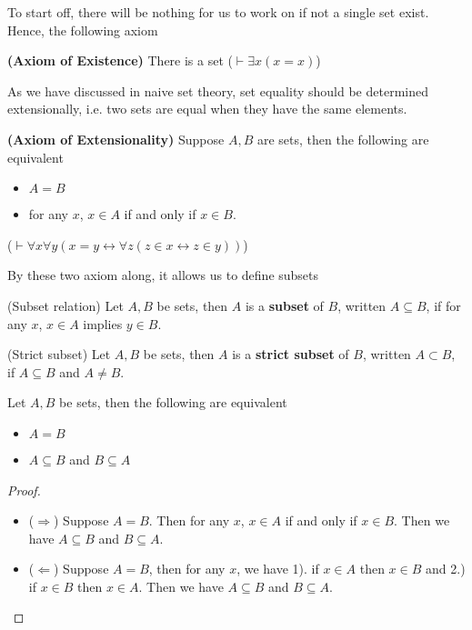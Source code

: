 To start off, there will be nothing for us to work on if not a single set exist. Hence, the following axiom
\begin{ax}
    \textbf{(Axiom of Existence)} There is a set ($\vdash \exists x(x=x)$)
\end{ax}
As we have discussed in naive set theory, set equality should be determined extensionally, i.e. two sets are equal when they have the same elements. 
\begin{ax}
    \textbf{(Axiom of Extensionality)} Suppose $A,B$ are sets, then the following are equivalent
    \begin{itemize}
        \item $A = B$
        \item for any $x$, $x\in A$ if and only if $x\in B$.
    \end{itemize}
    ($\vdash \forall x\forall y (x=y\leftrightarrow \forall z(z\in x\leftrightarrow z\in y))$)
\end{ax}
By these two axiom along, it allows us to define subsets 
\begin{defn}
    (Subset relation) Let $A,B$ be sets, then $A$ is a \textbf{subset} of $B$, written $A\subseteq B$, if for any $x$, $x\in A$ implies $y\in B$.
\end{defn}
\begin{defn}
    (Strict subset) Let $A,B$ be sets, then $A$ is a \textbf{strict subset} of $B$, written $A\subset B$, if $A\subseteq B$ and $A\neq B$.
\end{defn}
\begin{prop}
    Let $A,B$ be sets, then the following are equivalent
    \begin{itemize}
        \item $A=B$
        \item $A\subseteq B$ and $B\subseteq A$
    \end{itemize}
\end{prop}
\begin{proof}
    ~ 
    \begin{itemize}
        \item ($\Rightarrow$) Suppose $A=B$. Then for any $x$, $x\in A$ if and only if $x\in B$. Then we have $A\subseteq B$ and $B\subseteq A$.
        \item ($\Leftarrow$) Suppose $A= B$, then for any $x$, we have 1). if $x\in A$ then $x\in B$ and 2.) if $x\in B$ then $x\in A$. Then we have $A\subseteq B$ and $B\subseteq A$.
    \end{itemize}
\end{proof}
